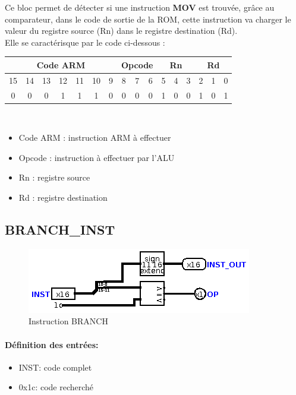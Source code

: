 \documentclass[a4paper]{article} %
\begin{document}
Ce bloc permet de détecter si une instruction \textbf{MOV} est trouvée, grâce au comparateur, dans le code de sortie de la ROM, cette instruction va charger le valeur du registre source (Rn) dans le registre destination (Rd).\\
Elle se caractérisque par le code ci-dessous : 
\\
\begin{tabular}{|ccccccc|ccc|ccc|ccc|}
    \hline
    \multicolumn{7}{|c|}{Code ARM}  & \multicolumn{3}{|c|}{Opcode} & \multicolumn{3}{|c|}{Rn} & \multicolumn{3}{|c|}{Rd}\\
    \hline
    15 & 14 & 13 & 12 & 11 & 10 & 9 & 8 & 7 & 6                    & 5 & 4 & 3                & 2 & 1 & 0 \\
    \hline
    0  & 0  & 0  & 1  & 1  & 1  & 0 & 0 & 0 & 0                    & 1 & 0 & 0                & 1 & 0 & 1 \\
    \hline     
    \end{tabular}
\\
\begin{itemize}
    \item     Code ARM : instruction ARM à effectuer
    \item     Opcode : instruction à effectuer par l'ALU
    \item     Rn : registre source
    \item     Rd : registre destination
\end{itemize}


\subsection{BRANCH\_INST} \label{branchinst}
\begin{figure}[H]
    \centering
    \includegraphics[width=.8\textwidth]{src/BRANCH_INST.png}
    \caption{Instruction BRANCH}
    \label{branch}
\end{figure}

\paragraph{Définition des entrées:}
\begin{itemize}
    \item     INST: code complet
    \item     0x1c: code recherché
\end{itemize}
\end{document}
